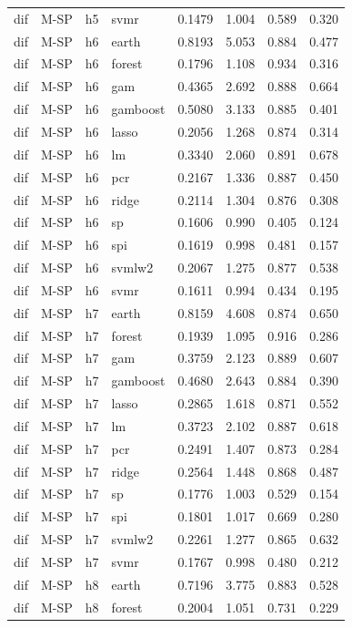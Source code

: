 \begin{ThreePartTable}
\begin{longtable}[t]{llclcccc}
dif & M-SP & h5 & svmr & 0.1479 & 1.004 & 0.589 & 0.320\\
\addlinespace
dif & M-SP & h6 & earth & 0.8193 & 5.053 & 0.884 & 0.477\\
dif & M-SP & h6 & forest & 0.1796 & 1.108 & 0.934 & 0.316\\
dif & M-SP & h6 & gam & 0.4365 & 2.692 & 0.888 & 0.664\\
dif & M-SP & h6 & gamboost & 0.5080 & 3.133 & 0.885 & 0.401\\
dif & M-SP & h6 & lasso & 0.2056 & 1.268 & 0.874 & 0.314\\
dif & M-SP & h6 & lm & 0.3340 & 2.060 & 0.891 & 0.678\\
dif & M-SP & h6 & pcr & 0.2167 & 1.336 & 0.887 & 0.450\\
dif & M-SP & h6 & ridge & 0.2114 & 1.304 & 0.876 & 0.308\\
dif & M-SP & h6 & sp & 0.1606 & 0.990 & 0.405 & 0.124\\
dif & M-SP & h6 & spi & 0.1619 & 0.998 & 0.481 & 0.157\\
dif & M-SP & h6 & svmlw2 & 0.2067 & 1.275 & 0.877 & 0.538\\
dif & M-SP & h6 & svmr & 0.1611 & 0.994 & 0.434 & 0.195\\
\addlinespace
dif & M-SP & h7 & earth & 0.8159 & 4.608 & 0.874 & 0.650\\
dif & M-SP & h7 & forest & 0.1939 & 1.095 & 0.916 & 0.286\\
dif & M-SP & h7 & gam & 0.3759 & 2.123 & 0.889 & 0.607\\
dif & M-SP & h7 & gamboost & 0.4680 & 2.643 & 0.884 & 0.390\\
dif & M-SP & h7 & lasso & 0.2865 & 1.618 & 0.871 & 0.552\\
dif & M-SP & h7 & lm & 0.3723 & 2.102 & 0.887 & 0.618\\
dif & M-SP & h7 & pcr & 0.2491 & 1.407 & 0.873 & 0.284\\
dif & M-SP & h7 & ridge & 0.2564 & 1.448 & 0.868 & 0.487\\
dif & M-SP & h7 & sp & 0.1776 & 1.003 & 0.529 & 0.154\\
dif & M-SP & h7 & spi & 0.1801 & 1.017 & 0.669 & 0.280\\
dif & M-SP & h7 & svmlw2 & 0.2261 & 1.277 & 0.865 & 0.632\\
dif & M-SP & h7 & svmr & 0.1767 & 0.998 & 0.480 & 0.212\\
\addlinespace
dif & M-SP & h8 & earth & 0.7196 & 3.775 & 0.883 & 0.528\\
dif & M-SP & h8 & forest & 0.2004 & 1.051 & 0.731 & 0.229\\

\end{longtable}
\end{ThreePartTable}
